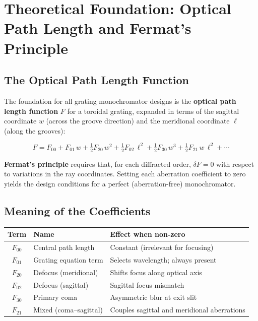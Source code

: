 \documentclass[12pt,a4paper]{article}
\begin{document}
\section{Theoretical Foundation: Optical Path Length and Fermat's Principle}

\subsection{The Optical Path Length Function}

The foundation for all grating monochromator designs is the \textbf{optical path length
function} $F$ for a toroidal grating, expanded in terms of the sagittal coordinate $w$
(across the groove direction) and the meridional coordinate $\ell$ (along the grooves):

\begin{equation}
  F = F_{00} + F_{01}\,w
    + \tfrac{1}{2}F_{20}\,w^2
    + \tfrac{1}{2}F_{02}\,\ell^2
    + \tfrac{1}{2}F_{30}\,w^3
    + \tfrac{1}{2}F_{21}\,w\,\ell^2
    + \cdots
  \label{eq:OPL}
\end{equation}

\textbf{Fermat's principle} requires that, for each diffracted order, $\delta F = 0$ with
respect to variations in the ray coordinates.  Setting each aberration coefficient to zero
yields the design conditions for a perfect (aberration-free) monochromator.

\subsection{Meaning of the Coefficients}

\begin{center}
\renewcommand{\arraystretch}{1.5}
\begin{tabular}{cll}
\toprule
\textbf{Term} & \textbf{Name} & \textbf{Effect when non-zero} \\
\midrule
$F_{00}$ & Central path length    & Constant (irrelevant for focusing) \\
$F_{01}$ & Grating equation term  & Selects wavelength; always present \\
$F_{20}$ & Defocus (meridional)   & Shifts focus along optical axis \\
$F_{02}$ & Defocus (sagittal)     & Sagittal focus mismatch \\
$F_{30}$ & Primary coma           & Asymmetric blur at exit slit \\
$F_{21}$ & Mixed (coma--sagittal) & Couples sagittal and meridional aberrations \\
\bottomrule
\end{tabular}
\end{center}
\end{document}
